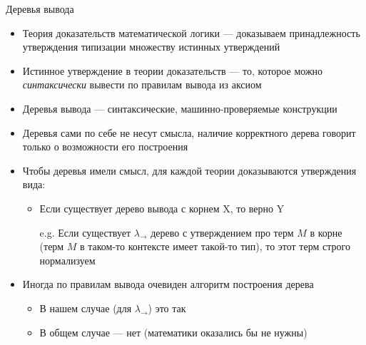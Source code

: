     \begin{frame}{Деревья вывода \popslide}
        \begin{itemize}
            \item Теория доказательств математической логики --- доказываем принадлежность утверждения типизации множеству истинных утверждений
            \item Истинное утверждение в теории доказательств --- то, которое можно \emph{синтаксически} вывести по правилам вывода из аксиом
            \item Деревья вывода --- синтаксические, машинно-проверяемые конструкции
            \item Деревья сами по себе не несут смысла, наличие корректного дерева говорит только о возможности его построения
            \item Чтобы деревья имели смысл, для каждой теории доказываются утверждения вида:
            \begin{itemize}
                \item Если существует дерево вывода с корнем X, то верно Y
                \item[e.g.] Если существует $\lambda_\to$ дерево с утверждением про терм $M$ в корне (терм $M$ в таком-то контексте имеет такой-то тип), то этот терм строго нормализуем
            \end{itemize}
            \item Иногда по правилам вывода очевиден алгоритм построения дерева
            \begin{itemize}
                \item В нашем случае (для $\lambda_\to$) это так
                \item В общем случае --- нет (математики оказались бы не нужны)
            \end{itemize}
        \end{itemize}
    \end{frame}

